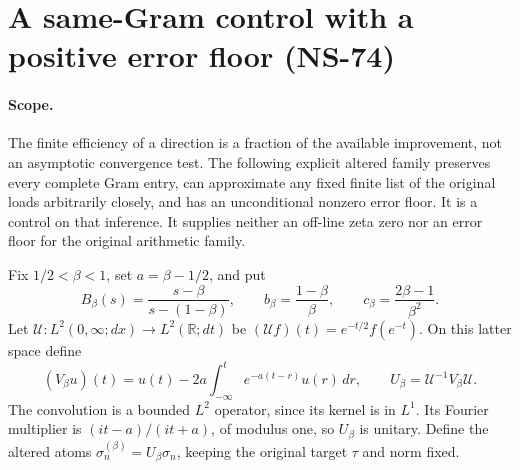 \section{A same-Gram control with a positive error floor (NS-74)}
\label{sec:ns74-same-gram-control}

\paragraph{Scope.}
The finite efficiency of a direction is a fraction of the available
improvement, not an asymptotic convergence test. The following explicit
altered family preserves every complete Gram entry, can approximate any
fixed finite list of the original loads arbitrarily closely, and has an
unconditional nonzero error floor. It is a control on that inference.
It supplies neither an off-line zeta zero nor an error floor for the
original arithmetic family.

Fix $1/2<\beta<1$, set $a=\beta-1/2$, and put
\[
 B_\beta(s)=\frac{s-\beta}{s-(1-\beta)},\qquad
 b_\beta=\frac{1-\beta}{\beta},\qquad
 c_\beta=\frac{2\beta-1}{\beta^2}.
\]
Let $\mathcal U:L^2(0,\infty;dx)\to L^2(\mathbb R;dt)$ be
$(\mathcal Uf)(t)=e^{-t/2}f(e^{-t})$. On this latter space define
\[
 (V_\beta u)(t)=u(t)-2a\int_{-\infty}^t
                                      e^{-a(t-r)}u(r)\,dr,
 \qquad U_\beta=\mathcal U^{-1}V_\beta\mathcal U.
\]
The convolution is a bounded $L^2$ operator, since its kernel is in
$L^1$. Its Fourier multiplier is $(it-a)/(it+a)$, of modulus one,
so $U_\beta$ is unitary. Define the altered atoms
$\sigma_n^{(\beta)}=U_\beta\sigma_n$, keeping the original target
$\tau$ and norm fixed.

